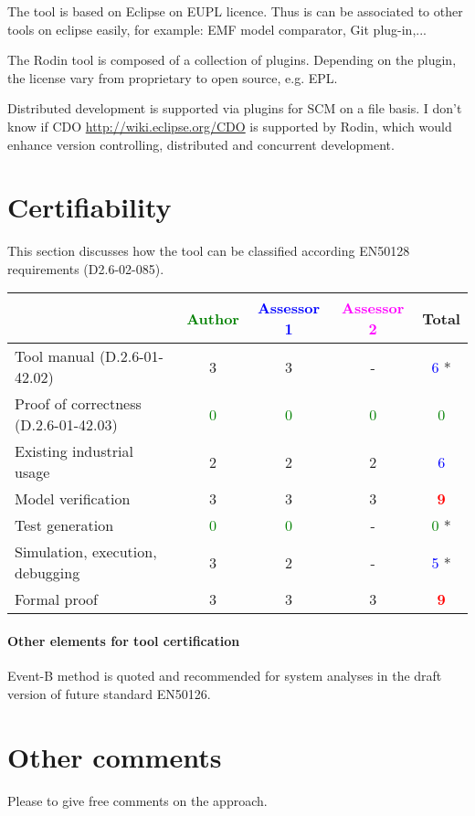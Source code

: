 \begin{author_comment}
The tool is based on Eclipse on EUPL licence. Thus is can be associated to  other tools on eclipse easily, for example: EMF model comparator, Git plug-in,...
\end{author_comment}

\begin{assessor2}
  The Rodin tool is composed of a collection of plugins. Depending on
  the plugin, the license vary from proprietary to open source,
  e.g. EPL.
\end{assessor2}

\begin{assessor2}
  Distributed development is supported via plugins for SCM on a file
  basis. I don't know if CDO \url{http://wiki.eclipse.org/CDO} is
  supported by Rodin, which would enhance version controlling,
  distributed and concurrent development.
\end{assessor2}

\section{Certifiability}

This section discusses how the tool can be classified according EN50128 requirements (D2.6-02-085).


\begin{tabular}{|l | c | c | c | c|}
\hline
& \textcolor{green}{Author} & \textcolor{blue}{Assessor 1} & \textcolor{magenta}{Assessor 2} & Total \\
\hline 
Tool manual (D.2.6-01-42.02) & 3     & 3     & - & \textcolor{blue}{6} *  \\
\hline
Proof of correctness (D.2.6-01-42.03)   & \textcolor{green}{0} & \textcolor{green}{0} & \textcolor{green}{0} & \textcolor{green}{0} \\
\hline
Existing industrial usage  & 2     & 2     & 2     & \textcolor{blue}{6} \\
\hline
Model verification & 3     & 3     & 3     & \textcolor{red}{\textbf{9}} \\
\hline
Test generation & \textcolor{green}{0} & \textcolor{green}{0} & - & \textcolor{green}{0} * \\
\hline
Simulation, execution, debugging & 3     & 2     & - & \textcolor{blue}{5} * \\
\hline
Formal proof &3  & 3     & 3     & \textcolor{red}{\textbf{9}} \\
\hline
\end{tabular}

\paragraph{Other elements for tool certification}

\begin{author_comment}
Event-B method is quoted and recommended for system analyses in the draft version of future standard EN50126.

\end{author_comment}

\section{Other comments}
Please to  give free comments on the approach.



